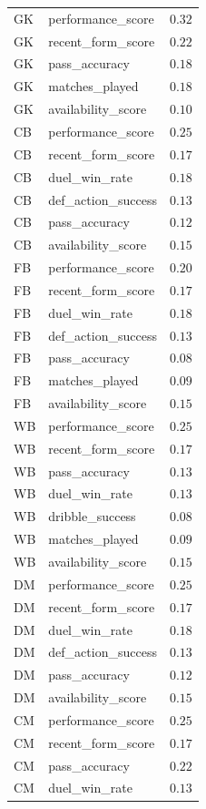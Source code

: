 \begin{small}
\begin{longtable}{|l|l|c|}
GK & performance\_score & $0.32$ \\
GK & recent\_form\_score & $0.22$ \\
GK & pass\_accuracy & $0.18$ \\
GK & matches\_played & $0.18$ \\
GK & availability\_score & $0.10$ \\
\hline
CB & performance\_score & $0.25$ \\
CB & recent\_form\_score & $0.17$ \\
CB & duel\_win\_rate & $0.18$ \\
CB & def\_action\_success & $0.13$ \\
CB & pass\_accuracy & $0.12$ \\
CB & availability\_score & $0.15$ \\
\hline
FB & performance\_score & $0.20$ \\
FB & recent\_form\_score & $0.17$ \\
FB & duel\_win\_rate & $0.18$ \\
FB & def\_action\_success & $0.13$ \\
FB & pass\_accuracy & $0.08$ \\
FB & matches\_played & $0.09$ \\
FB & availability\_score & $0.15$ \\
\hline
WB & performance\_score & $0.25$ \\
WB & recent\_form\_score & $0.17$ \\
WB & pass\_accuracy & $0.13$ \\
WB & duel\_win\_rate & $0.13$ \\
WB & dribble\_success & $0.08$ \\
WB & matches\_played & $0.09$ \\
WB & availability\_score & $0.15$ \\
\hline
DM & performance\_score & $0.25$ \\
DM & recent\_form\_score & $0.17$ \\
DM & duel\_win\_rate & $0.18$ \\
DM & def\_action\_success & $0.13$ \\
DM & pass\_accuracy & $0.12$ \\
DM & availability\_score & $0.15$ \\
\hline
CM & performance\_score & $0.25$ \\
CM & recent\_form\_score & $0.17$ \\
CM & pass\_accuracy & $0.22$ \\
CM & duel\_win\_rate & $0.13$ \\

\end{longtable}
\end{small}
